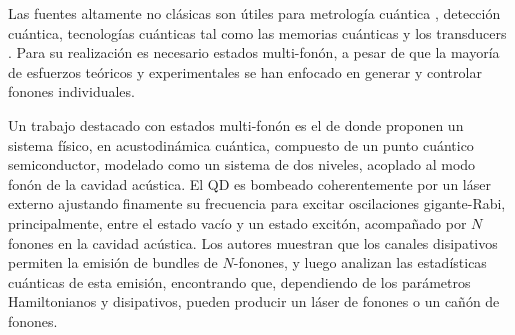 \documentclass[main.tex]{subfiles}
\begin{document}
Las fuentes altamente no clásicas son útiles para metrología cuántica \parencite{Zhang2018}, detección cuántica, tecnologías cuánticas tal como las memorias cuánticas y los transducers \parencite{Arrangoiz2018}. Para su realización es necesario estados multi-fonón, a pesar de que la mayoría de esfuerzos teóricos y experimentales se han enfocado en generar y controlar fonones individuales.

Un trabajo destacado con estados multi-fonón es el de \textcite{Bin2020} donde proponen un sistema físico, en acustodinámica cuántica, compuesto de un punto cuántico semiconductor, modelado como un sistema de dos niveles, acoplado al modo fonón de la cavidad acústica. El QD es bombeado coherentemente por un láser externo ajustando finamente su frecuencia para excitar oscilaciones gigante-Rabi, principalmente, entre el estado vacío y un estado excitón, acompañado por $N$ fonones en la cavidad acústica. Los autores muestran que los canales disipativos permiten la emisión de bundles de $N$-fonones, y luego analizan las estadísticas cuánticas de esta emisión, encontrando que, dependiendo de los parámetros Hamiltonianos y disipativos, pueden producir un láser de fonones o un cañón de fonones.

\end{document}

